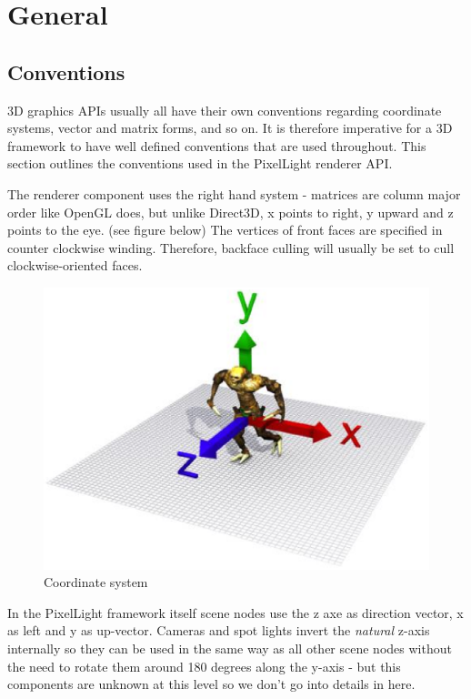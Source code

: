 \section{General}




\subsection{Conventions}
3D graphics APIs usually all have their own conventions regarding coordinate systems, vector and matrix forms, and so on. It is therefore imperative for a 3D framework to have well defined conventions that are used throughout. This section outlines the conventions used in the PixelLight renderer API.

The renderer component uses the right hand system - matrices are column major order like OpenGL does, but unlike Direct3D, x points to right, y upward and z points to the eye. (see figure below) The vertices of front faces are specified in counter clockwise winding. Therefore, backface culling will usually be set to cull clockwise-oriented faces.

\begin{figure}
  \centering
  \includegraphics[scale=0.7]{pics/CoordinateSystem.eps}
  \caption{Coordinate system}
  \label{fig:Coordinate system}
\end{figure}

In the PixelLight framework itself scene nodes use the z axe as direction vector, x as left and y as up-vector. Cameras and spot lights invert the \emph{natural} z-axis internally so they can be used in the same way as all other scene nodes without the need to rotate them around 180 degrees along the y-axis - but this components are unknown at this level so we don't go into details in here.




